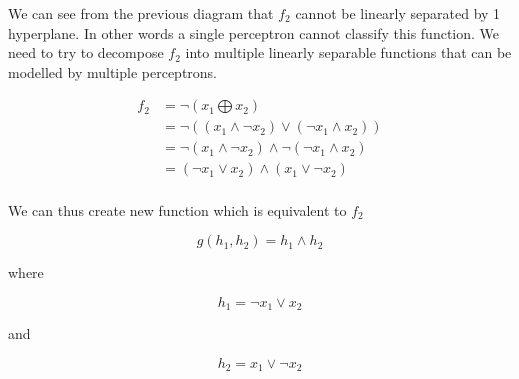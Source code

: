 \documentclass[10pt,a4paper]{article}
\begin{document}
\begin{center}
\end{center}

We can see from the previous diagram that $f_2$ cannot be linearly separated by 1 hyperplane. In other words a single perceptron cannot classify this function. We need to try to decompose $f_2$ into multiple linearly separable functions that can be modelled by multiple perceptrons.

\begin{equation}
\begin{split}
f_2 &= \neg ( x_1 \bigoplus x_2 ) \\
    &= \neg( (x_1 \wedge \neg x_2) \vee (\neg x_1 \wedge x_2))\\
    &= \neg(x_1\wedge \neg x_2) \wedge \neg(\neg x_1 \wedge x_2)\\
    &= (\neg x_1 \vee x_2) \wedge (x_1 \vee \neg x_2)\\
\end{split}
\end{equation}  

We can thus create new function which is equivalent to $f_2$

\begin{equation}
g(h_1,h_2) = h_1 \wedge h_2 
\end{equation} 

where 

\begin{equation}
h_1 = \neg x_1 \vee x_2
\end{equation}

and 

\begin{equation}
h_2 = x_1 \vee \neg x_2
\end{equation}
\end{document}
